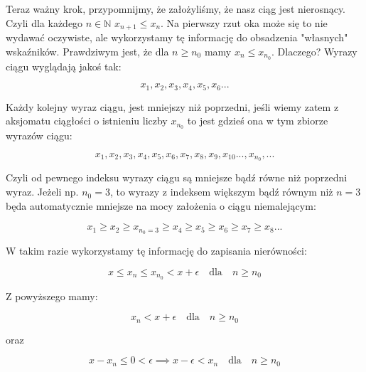 \documentclass[a4paper,oneside,openright,11pt]{article}
\numberwithin{equation}{section}
\begin{document}
\noindent
Teraz ważny krok, przypomnijmy, że założyliśmy, że nasz ciąg jest nierosnący. Czyli dla każdego $n \in \mathbb{N}$ $x_{n + 1} \leq x_n$.
Na pierwszy rzut oka może się to nie wydawać oczywiste, ale wykorzystamy tę informację do obsadzenia "własnych" wskaźników.
Prawdziwym jest, że dla $n \geq n_0$ mamy $x_n \leq x_{n_0}$. Dlaczego? Wyrazy ciągu wyglądają jakoś tak:


\begin{equation*}
    x_{1}, x_{2}, x_{3}, x_{4}, x_{5}, x_{6} ...
\end{equation*}


\noindent
Każdy kolejny wyraz ciągu, jest mniejszy niż poprzedni, jeśli wiemy zatem z aksjomatu ciągłości o istnieniu liczby  $x_{n_0}$ to jest gdzieś ona w tym zbiorze wyrazów ciągu:

\begin{equation*}
    x_{1}, x_{2}, x_{3}, x_{4}, x_{5}, x_{6}, x_{7}, x_{8}, x_{9}, x_{10} ... , x_{n_0}, ...
\end{equation*}

\noindent
Czyli od pewnego indeksu wyrazy ciągu są mniejsze bądź równe niż poprzedni wyraz. Jeżeli np. $n_0 = 3$, to wyrazy z indeksem większym bądź równym niż $n = 3$ będa automatycznie mniejsze
na mocy założenia o ciągu niemalejącym:

\begin{equation*}
    x_{1} \geq x_{2} \geq x_{n_0 = 3} \geq x_{4} \geq x_{5} \geq x_{6} \geq x_{7} \geq x_{8} ...
\end{equation*}

\vspace{10mm}
\noindent
W takim razie wykorzystamy tę informację do zapisania nierówności:

\begin{equation*}
    x \leq x_n \leq x_{n_0}  < x + \epsilon \quad \textrm{dla} \quad n \geq n_0
\end{equation*}

\noindent
Z powyższego mamy:

\begin{equation*}
    x_n < x + \epsilon \quad \textrm{dla} \quad n \geq n_0
\end{equation*}

oraz

\begin{equation*}
    x - x_{n} \leq 0 < \epsilon \implies x - \epsilon  < x_{n}  \quad \textrm{dla} \quad n \geq n_0
\end{equation*}
\end{document}
